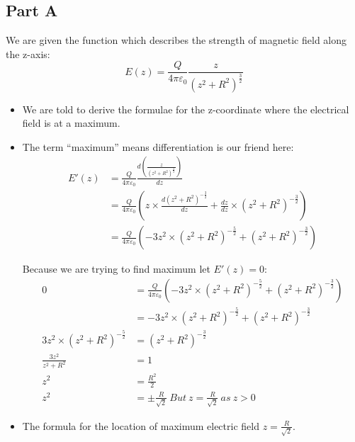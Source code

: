 \documentclass[10pt]{article}
\begin{document}
\subsection{Part A}
We are given the function which describes the strength of magnetic field along the z-axis:
\begin{displaymath}
E(z)=\frac{Q}{4 \pi \varepsilon_0}\frac{z}{(z^2+R^2)^{\frac{3}{2}}}
\end{displaymath}
\begin{itemize}
\item We are told to derive the formulae for the z-coordinate where the electrical field is at a maximum.
\item The term ``maximum'' means differentiation is our friend here:
\setcounter{equation}{0}
\begin{align*}
E'(z)&=\frac{Q}{4 \pi \varepsilon_0} \frac{ d \left(\frac{z}{(z^2+R^2)^{\frac{3}{2}}} \right) }{dz} \\
&=\frac{Q}{4 \pi \varepsilon_0} \left(z \times  \frac{d(z^2+R^2)^{-\frac{3}{2}}}{dz} + \frac{dz}{dz} \times (z^2+R^2)^{-\frac{3}{2}}\right) \\
&=\frac{Q}{4 \pi \varepsilon_0} \left(- 3 z^2 \times (z^2+R^2)^{-\frac{5}{2}} + (z^2+R^2)^{-\frac{3}{2}}\right)
\end{align*}

 Because we are trying to find maximum let $E'(z)=0$:
\begin{align*}
0&=\frac{Q}{4 \pi \varepsilon_0} \left(- 3 z^2 \times (z^2+R^2)^{-\frac{5}{2}} + (z^2+R^2)^{-\frac{3}{2}}\right) \\
&=- 3 z^2 \times (z^2+R^2)^{-\frac{5}{2}} + (z^2+R^2)^{-\frac{3}{2}} \\
3 z^2 \times (z^2+R^2)^{-\frac{5}{2}} &= (z^2+R^2)^{-\frac{3}{2}} \\
\frac{3 z^2}{ z^2+R^2} &= 1 \\
z^2 &= \frac{R^2}{2} \\
z^2 &= \pm\frac{R}{\sqrt{2}} \ But \ z= \frac{R}{\sqrt{2}} \ as \ z > 0
\end{align*}
\item The formula for the location of maximum electric field $z= \frac{R}{\sqrt{2}}$.
\pagebreak

\end{itemize}
\end{document}
